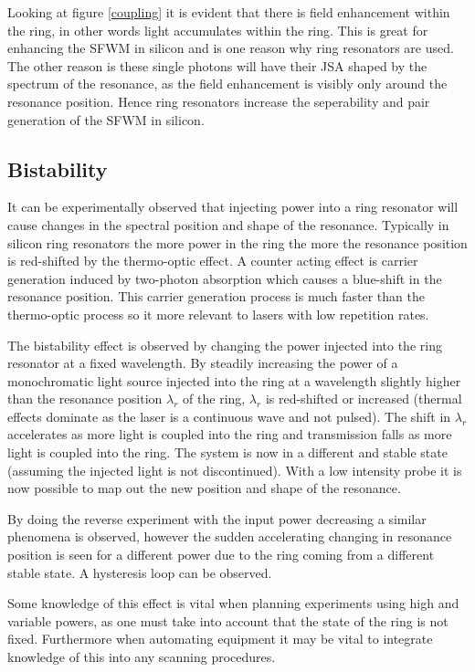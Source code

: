 Looking at figure \ref{coupling} it is evident that there is field enhancement within the ring, in other words light accumulates within the ring. This is great for enhancing the SFWM in silicon and is one reason why ring resonators are used. The other reason is these single photons will have their JSA shaped by the spectrum of the resonance, as the field enhancement is visibly only around the resonance position. Hence ring resonators increase the seperability and pair generation of the SFWM in silicon.

\subsection{Bistability}
It can be experimentally observed that injecting power into a ring resonator will cause changes in the spectral position and shape of the resonance. Typically in silicon ring resonators the more power in the ring the more the resonance position is red-shifted by the thermo-optic effect\cite{almeida_optical_2004-1}. A counter acting effect is carrier generation induced by two-photon absorption \cite{xu_carrier-induced_2006} which causes a blue-shift in the resonance position. This carrier generation process is much faster than the thermo-optic process so it more relevant to lasers with low repetition rates. 

The bistability effect is observed by changing the power injected into the ring resonator at a fixed wavelength. By steadily increasing the power of a monochromatic light source injected into the ring at a wavelength slightly higher than the resonance position $\lambda_{r}$ of the ring, $\lambda_{r}$ is red-shifted or increased (thermal effects dominate as the laser is a continuous wave and not pulsed). The shift in $\lambda_{r}$ accelerates as more light is coupled into the ring and transmission falls as more light is coupled into the ring. The system is now in a different and stable state (assuming the injected light is not discontinued). With a low intensity probe it is now possible to map out the new position and shape of the resonance.

By doing the reverse experiment with the input power decreasing a similar phenomena is observed, however the sudden accelerating changing in resonance position is seen for a different power due to the ring coming from a different stable state. A hysteresis loop can be observed.

Some knowledge of this effect is vital when planning experiments using high and variable powers, as one must take into account that the state of the ring is not fixed. Furthermore when automating equipment it may be vital to integrate knowledge of this into any scanning procedures. 

